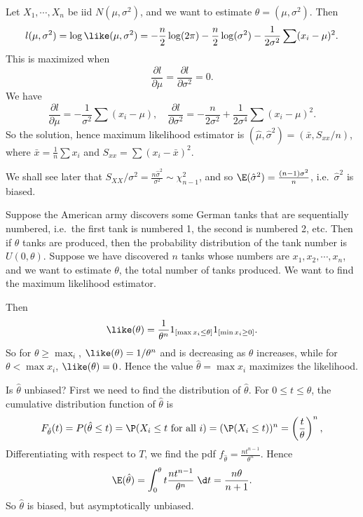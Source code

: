 \documentclass[a4paper]{article}
\begin{document}
\begin{eg}
  Let $X_1, \cdots, X_n$ be iid $N(\mu, \sigma^2)$, and we want to estimate $\theta = (\mu, \sigma^2)$. Then
  \[
    l(\mu, \sigma^2) = \log\like(\mu, \sigma^2) = -\frac{n}{2}\log (2\pi) - \frac{n}{2}\log (\sigma^2) - \frac{1}{2\sigma^2}\sum (x_i - \mu)^2.
  \]
  This is maximized when
  \[
    \frac{\partial l}{\partial\mu} = \frac{\partial l}{\partial \sigma^2} = 0.
  \]
  We have
  \[
    \frac{\partial l}{\partial \mu} = -\frac{1}{\sigma^2}\sum (x_i - \mu), \quad \frac{\partial l}{\partial\sigma^2} = -\frac{n}{2\sigma^2} + \frac{1}{2\sigma^4}\sum (x_i - \mu)^2.
  \]
  So the solution, hence maximum likelihood estimator is $(\hat{\mu}, \hat{\sigma}^2) = (\bar x, S_{xx}/n)$, where $\bar{x} = \frac{1}{n}\sum x_i$ and $S_{xx} = \sum(x_i - \bar{x})^2$.

  We shall see later that $S_{XX}/\sigma^2 = \frac{n\hat{\sigma}^2}{\sigma^2}\sim \chi_{n - 1}^2$, and so $\E(\hat{\sigma}^2) = \frac{(n - 1)\sigma^2}{n}$, i.e.\ $\hat{\sigma}^2$ is biased.
\end{eg}

\begin{eg}
   Suppose the American army discovers some German tanks that are sequentially numbered, i.e.\ the first tank is numbered 1, the second is numbered 2, etc. Then if $\theta$ tanks are produced, then the probability distribution of the tank number is $U(0, \theta)$. Suppose we have discovered $n$ tanks whose numbers are $x_1, x_2, \cdots, x_n$, and we want to estimate $\theta$, the total number of tanks produced. We want to find the maximum likelihood estimator.

  Then
  \[
    \like(\theta) = \frac{1}{\theta^n}1_{[\max x_i \leq \theta]}1_{[\min x_i\geq 0]}.
  \]
  So for $\theta\geq \max _i$, $\like (\theta) = 1/\theta^n$ and is decreasing as $\theta$ increases, while for $\theta < \max x_i$, $\like (\theta) = 0$. Hence the value $\hat{\theta} = \max x_i$ maximizes the likelihood.

  Is $\hat{\theta}$ unbiased? First we need to find the distribution of $\hat{\theta}$. For $0 \leq t \leq \theta$, the cumulative distribution function of $\hat{\theta}$ is
  \[
    F_{\hat{\theta}}(t) = P(\hat{\theta} \leq t) = \P(X_i \leq t \text{ for all }i) = (\P(X_i \leq t))^n = \left(\frac{t}{\theta}\right)^n,
  \]
  Differentiating with respect to $T$, we find the pdf $f_{\hat{\theta}} = \frac{nt^{n - 1}}{\theta^n}$. Hence
  \[
    \E(\hat{\theta}) = \int_0^\theta t\frac{nt^{n - 1}}{\theta^n} \;\d t = \frac{n\theta}{n + 1}.
  \]
  So $\hat{\theta}$ is biased, but asymptotically unbiased.
\end{eg}
\end{document}

